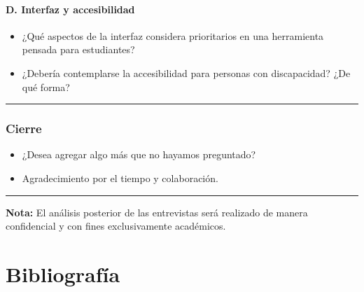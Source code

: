 \documentclass[12pt,oneside]{templates/unerthesis}
\providecommand{\tightlist}{%
  \setlength{\itemsep}{0pt}\setlength{\parskip}{0pt}}
\begin{document}
\hypertarget{d.-interfaz-y-accesibilidad}{%
\subsubsection{D. Interfaz y accesibilidad}\label{d.-interfaz-y-accesibilidad}}

\begin{itemize}
\tightlist
\item
  ¿Qué aspectos de la interfaz considera prioritarios en una herramienta pensada para estudiantes?
\item
  ¿Debería contemplarse la accesibilidad para personas con discapacidad? ¿De qué forma?
\end{itemize}

\begin{center}\rule{0.5\linewidth}{0.5pt}\end{center}

\hypertarget{cierre}{%
\subsection{Cierre}\label{cierre}}

\begin{itemize}
\tightlist
\item
  ¿Desea agregar algo más que no hayamos preguntado?
\item
  Agradecimiento por el tiempo y colaboración.
\end{itemize}

\begin{center}\rule{0.5\linewidth}{0.5pt}\end{center}

\textbf{Nota:} El análisis posterior de las entrevistas será realizado de manera confidencial y con fines exclusivamente académicos.

\hypertarget{Biblio}{%
\chapter{Bibliografía}\label{Biblio}}
\end{document}
